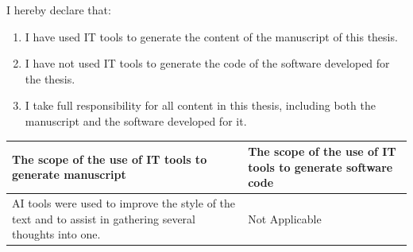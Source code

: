 \documentclass[a4paper,11pt,twoside]{report}
\theoremstyle{definition}
\begin{document}
\normalsize
I hereby declare that:
\begin{enumerate}
    \item I have used IT tools to generate the content of the manuscript of this thesis.
    \item I have not used IT tools to generate the code of the software developed for the thesis.
    \item I take full responsibility for all content in this thesis, including both the manuscript and the software developed for it.
\end{enumerate}

\begin{table}[h]
\centering
\begin{tabular}{|p{}|p{}|}
\hline
\textbf{The scope of the use of IT tools to generate manuscript} & \textbf{The scope of the use of IT tools to generate software code} \\ \hline
AI tools were used to improve the style of the text and to assist in gathering several thoughts into one.
& Not Applicable                       \\ \hline
\end{tabular}
\end{table}

\null\thispagestyle{empty}\newpage
%
%
%
%
%
\null\thispagestyle{empty}\newpage
\tableofcontents
\thispagestyle{empty}
\newpage %


\end{document}
